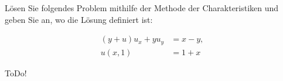 
\begin{exercise}

Lösen Sie folgendes Problem mithilfe der Methode der Charakteristiken und geben Sie an, wo die Lösung definiert ist:

\begin{align*}
    (y + u) u_x + y u_y
    & =
    x - y, \\
    u(x, 1)
    & =
    1 + x
\end{align*}

\end{exercise}


\begin{solution}

ToDo!

\end{solution}

